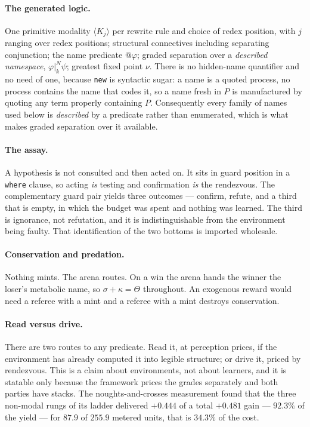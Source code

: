 \documentclass[11pt,a4paper]{article}
\makeatletter
\theoremstyle{plain}
\theoremstyle{definition}
\theoremstyle{remark}
\newcommand{\qt}[1]{\ensuremath{@#1}}
\newcommand{\Kmod}[1]{\langle K_{#1}\rangle}
\newcommand{\gsep}[2]{\mathbin{|_{#1}^{#2}}}
\makeatother
\begin{document}
\paragraph{The generated logic.} One primitive modality $\Kmod{j}$ per rewrite
rule and choice of redex position, with $j$ ranging over redex positions;
structural connectives including separating conjunction; the name predicate
$\qt\varphi$; graded separation over a \emph{described namespace},
$\varphi \gsep{k}{N} \psi$; greatest fixed point $\nu$. There is no hidden-name
quantifier and no need of one, because \texttt{new} is syntactic sugar: a name
is a quoted process, no process contains the name that codes it, so a name
fresh in $P$ is manufactured by quoting any term properly containing $P$.
Consequently every family of names used below is \emph{described} by a
predicate rather than enumerated, which is what makes graded separation over it
available.

\paragraph{The assay.} A hypothesis is not consulted and then acted on. It sits
in guard position in a \texttt{where} clause, so acting \emph{is} testing and
confirmation \emph{is} the rendezvous. The complementary guard pair yields three
outcomes --- confirm, refute, and a third that is empty, in which the budget was
spent and nothing was learned. The third is ignorance, not refutation, and it is
indistinguishable from the environment being faulty. That identification of the
two bottoms is imported wholesale.

\paragraph{Conservation and predation.} Nothing mints. The arena routes. On a
win the arena hands the winner the loser's metabolic name, so $\sigma + \kappa =
\Theta$ throughout. An exogenous reward would need a referee with a mint and a
referee with a mint destroys conservation.

\paragraph{Read versus drive.} There are two routes to any predicate. Read it,
at perception prices, if the environment has already computed it into legible
structure; or drive it, priced by rendezvous. This is a claim about
environments, not about learners, and it is statable only because the framework
prices the grades separately and both parties have stacks. The
noughts-and-crosses measurement found that the three non-modal rungs of its
ladder delivered $+0.444$ of a total $+0.481$ gain --- $92.3\%$ of the yield ---
for $87.9$ of $255.9$ metered units, that is $34.3\%$ of the cost.
\end{document}
